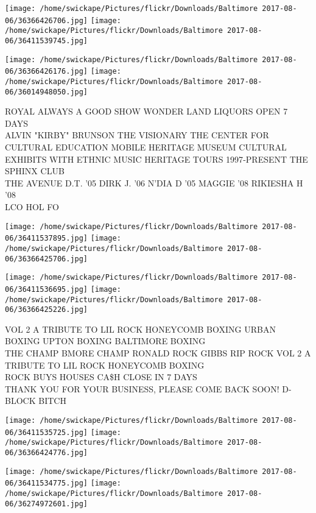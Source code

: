 \documentclass[10pt,letterpaper]{article}
\begin{document}
\texttt{[image: /home/swickape/Pictures/flickr/Downloads/Baltimore 2017-08-06/36366426706.jpg]}
\texttt{[image: /home/swickape/Pictures/flickr/Downloads/Baltimore 2017-08-06/36411539745.jpg]}

\texttt{[image: /home/swickape/Pictures/flickr/Downloads/Baltimore 2017-08-06/36366426176.jpg]}
\texttt{[image: /home/swickape/Pictures/flickr/Downloads/Baltimore 2017-08-06/36014948050.jpg]}

ROYAL ALWAYS A GOOD SHOW WONDER LAND LIQUORS OPEN 7 DAYS\\
ALVIN "KIRBY" BRUNSON THE VISIONARY THE CENTER FOR CULTURAL EDUCATION MOBILE HERITAGE MUSEUM CULTURAL EXHIBITS WITH ETHNIC MUSIC HERITAGE TOURS 1997{-}PRESENT THE SPHINX CLUB\\
THE AVENUE D.T. '05 DIRK J. '06 N'DIA D '05 MAGGIE '08 RIKIESHA H '08\\
LCO HOL FO\\
\pagebreak

\texttt{[image: /home/swickape/Pictures/flickr/Downloads/Baltimore 2017-08-06/36411537895.jpg]}
\texttt{[image: /home/swickape/Pictures/flickr/Downloads/Baltimore 2017-08-06/36366425706.jpg]}

\texttt{[image: /home/swickape/Pictures/flickr/Downloads/Baltimore 2017-08-06/36411536695.jpg]}
\texttt{[image: /home/swickape/Pictures/flickr/Downloads/Baltimore 2017-08-06/36366425226.jpg]}

VOL 2 A TRIBUTE TO LIL ROCK HONEYCOMB BOXING URBAN BOXING UPTON BOXING BALTIMORE BOXING\\
THE CHAMP BMORE CHAMP RONALD ROCK GIBBS RIP ROCK VOL 2 A TRIBUTE TO LIL ROCK HONEYCOMB BOXING\\
ROCK BUYS HOUSES CA\$H CLOSE IN 7 DAYS\\
THANK YOU FOR YOUR BUSINESS, PLEASE COME BACK SOON!  D{-}BLOCK BITCH\\
\pagebreak

\texttt{[image: /home/swickape/Pictures/flickr/Downloads/Baltimore 2017-08-06/36411535725.jpg]}
\texttt{[image: /home/swickape/Pictures/flickr/Downloads/Baltimore 2017-08-06/36366424776.jpg]}

\texttt{[image: /home/swickape/Pictures/flickr/Downloads/Baltimore 2017-08-06/36411534775.jpg]}
\texttt{[image: /home/swickape/Pictures/flickr/Downloads/Baltimore 2017-08-06/36274972601.jpg]}
\end{document}

